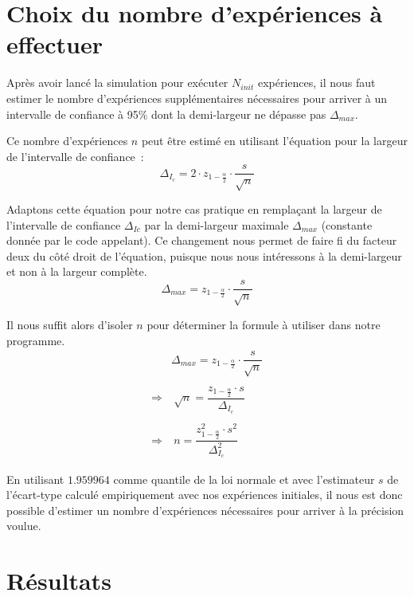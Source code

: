 \documentclass[paper=a4, fontsize=11pt]{scrartcl}
\begin{document}
\section{Choix du nombre d'expériences à effectuer}

Après avoir lancé la simulation pour exécuter $N_{init}$ expériences, il nous faut estimer le nombre d'expériences supplémentaires nécessaires pour arriver à un intervalle de confiance à 95\% dont la demi-largeur ne dépasse pas $\Delta_{max}$.

Ce nombre d'expériences $n$ peut être estimé en utilisant l'équation pour la largeur de l'intervalle de confiance~:
\begin{equation*}
  \Delta_{I_c} = 2\cdot z_{1-\frac{\alpha}{2}}\cdot \dfrac{s}{\sqrt{n}}
\end{equation*}

Adaptons cette équation pour notre cas pratique en remplaçant la largeur de l'intervalle de confiance $\Delta_{Ic}$ par la demi-largeur maximale $\Delta_{max}$ (constante donnée par le code appelant). Ce changement nous permet de faire fi du facteur deux du côté droit de l'équation, puisque nous nous intéressons à la demi-largeur et non à la largeur complète.
\begin{equation*}
  \Delta_{max} = z_{1-\frac{\alpha}{2}}\cdot \dfrac{s}{\sqrt{n}}
\end{equation*}

Il nous suffit alors d'isoler $n$ pour déterminer la formule à utiliser dans notre programme.
\begin{align*}
  &\Delta_{max} = z_{1-\frac{\alpha}{2}}\cdot \dfrac{s}{\sqrt{n}} \\ \\
  \Rightarrow &\ \sqrt{n} = \dfrac{z_{1-\frac{\alpha}{2}}\cdot s}{\Delta_{I_c}} \\ \\
  \Rightarrow &\ n = \dfrac{z_{1-\frac{\alpha}{2}}^2\cdot s^2}{\Delta_{I_c}^2}
\end{align*}

En utilisant $1.959964$ comme quantile de la loi normale et avec l'estimateur $s$ de l'écart-type calculé empiriquement avec nos expériences initiales, il nous est donc possible d'estimer un nombre d'expériences nécessaires pour arriver à la précision voulue.

\section{Résultats}
\end{document}
